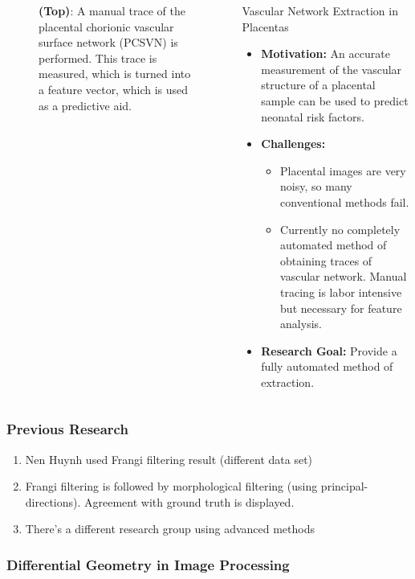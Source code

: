 \documentclass[9pt]{beamer}
\begin{document}
\begin{frame}
\begin{columns}[c]
\begin{column}{0.5\textwidth}
\begin{figure}
				\caption{\scriptsize \textbf{(Top)}: A manual trace of the placental chorionic vascular surface network (PCSVN) is performed. This trace is measured, which is turned into a feature vector, which is used as a predictive aid.}
			\end{figure}
		\end{column}
		\begin{column}{0.5\textwidth}
			\begin{block}{Vascular Network Extraction in Placentas}
				\begin{itemize}
					\item \textbf{Motivation:} An accurate measurement of the vascular structure of a placental sample can be used to predict neonatal risk factors.
					\item \textbf{Challenges:}
					\begin{itemize}
						\item Placental images are very noisy, so many conventional methods fail.
						\item Currently no completely automated method of obtaining traces of vascular network. Manual tracing is labor intensive but necessary for feature analysis.
					\end{itemize}
					\item \textbf{Research Goal:} Provide a fully automated method of extraction.
				\end{itemize}
			\end{block}
		\end{column}
	\end{columns}
\end{frame}

\begin{frame}
	\frametitle{Previous Research}
	
	\begin{enumerate}[\bfseries(a)]
	\item Nen Huynh used Frangi filtering result (different data set)
	\item Frangi filtering is followed by morphological filtering (using principal-directions). Agreement with ground truth is displayed. 
  \item There's a different research group using advanced methods
	\end{enumerate}
	
	\end{frame}

%
\begin{frame}
\frametitle{Differential Geometry in Image Processing}
\end{frame}
\end{document}
